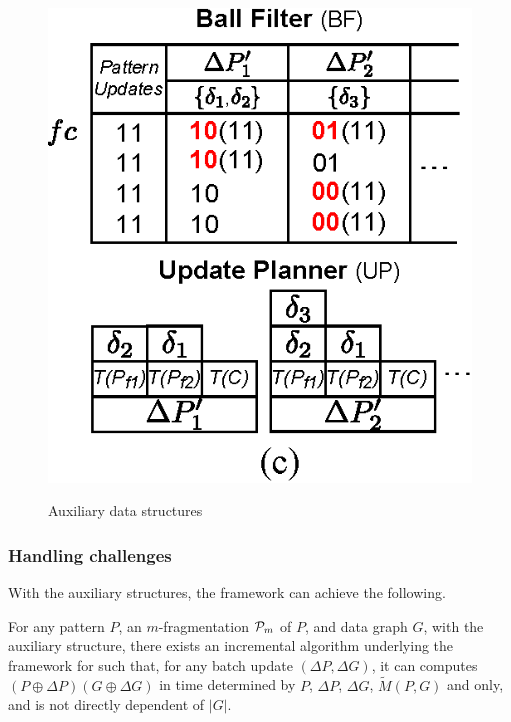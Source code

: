 \begin{figure}[tb!]
\begin{center}
{\includegraphics[scale=0.55]{./fig/fig-inc-maintain-batch.eps}}
\caption{Auxiliary data structures}
\label{fig-auxiliary-data-structures}
\end{center}
\vspace{-4ex}
\end{figure}


\subsubsection{Handling challenges}
\label{subsubsec-handle}

With the auxiliary structures, the framework can achieve the following.

\begin{theorem}
\label{thm-pattern-incremental}
For any pattern $P$, an $m$-fragmentation ${\cal P}_{m}$ of $P$, and data graph $G$,
with the auxiliary structure, there exists an incremental algorithm underlying the framework for \dyngr such that, for any batch update $(\Delta P, \Delta G)$, it can computes $(P\oplus \Delta P)(G\oplus \Delta G)$ in time determined by $P$, $\Delta P$, $\Delta G$, $\tilde{M}(P, G)$ and \affballx only, and is not directly dependent of $|G|$.
\end{theorem}

